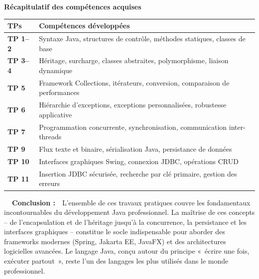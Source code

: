 \documentclass[12pt,a4paper]{report}
\newcommand{\conclusionTP}[1]{%
  \begin{conclusionTPBox}
    \textbf{\color{vertSucces}\faCheckCircle~~Conclusion :}~~#1
  \end{conclusionTPBox}
}
\begin{document}
\begin{mdframed}[linecolor=bleuENSA, linewidth=1.5pt,
                 backgroundcolor=bleuClair,
                 innertopmargin=16pt, innerbottommargin=16pt,
                 innerleftmargin=18pt, innerrightmargin=18pt,
                 roundcorner=4pt,
                 topline=true, bottomline=true,
                 leftline=true, rightline=true]
\textbf{\color{bleuENSA}Récapitulatif des compétences acquises}

\vspace{8pt}
\renewcommand{\arraystretch}{1.35}
\begin{tabularx}{\linewidth}{@{}>{\bfseries}l X@{}}
\toprule
\rowcolor{bleuENSA!12}
\textbf{TPs} & \textbf{Compétences développées} \\
\midrule
TP 1--2  & Syntaxe Java, structures de contrôle, méthodes statiques, classes de base \\
TP 3--4  & Héritage, surcharge, classes abstraites, polymorphisme, liaison dynamique \\
TP 5     & Framework Collections, itérateurs, conversion, comparaison de performances \\
TP 6     & Hiérarchie d'exceptions, exceptions personnalisées, robustesse applicative \\
TP 7     & Programmation concurrente, synchronisation, communication inter-threads \\
TP 9     & Flux texte et binaire, sérialisation Java, persistance de données \\
TP 10    & Interfaces graphiques Swing, connexion JDBC, opérations CRUD \\
TP 11    & Insertion JDBC sécurisée, recherche par clé primaire, gestion des erreurs \\
\bottomrule
\end{tabularx}
\end{mdframed}

\vspace{0.8cm}

\conclusionTP{L'ensemble de ces travaux pratiques couvre les fondamentaux
incontournables du développement Java professionnel. La maîtrise de ces
concepts -- de l'encapsulation et de l'héritage jusqu'à la concurrence,
la persistance et les interfaces graphiques -- constitue le socle
indispensable pour aborder des frameworks modernes (Spring, Jakarta EE,
JavaFX) et des architectures logicielles avancées. Le langage Java, conçu
autour du principe «~écrire une fois, exécuter partout~», reste l'un des
langages les plus utilisés dans le monde professionnel.}
\end{document}
